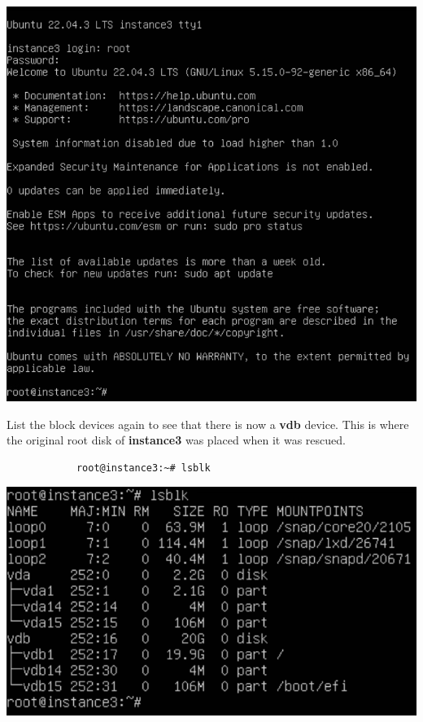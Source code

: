 \documentclass[letterpaper, 12pt]{article}
\begin{document}
\begin{enumerate}
\begin{labstep}
        \begin{center}
            \includegraphics[width=\linewidth]{images/part7/step16.png}
        \end{center}
    \end{labstep}

    \begin{labstep}
        List the block devices again to see that there is now a \textbf{vdb} device.
        This is where the original root disk of \textbf{instance3} was placed when it was rescued.
        \begin{lstlisting}
            root@instance3:~# lsblk
        \end{lstlisting}

        \begin{center}
            \includegraphics[width=\linewidth]{images/part7/step17.png}
        \end{center}
    \end{labstep}


\end{enumerate}
\end{document}
